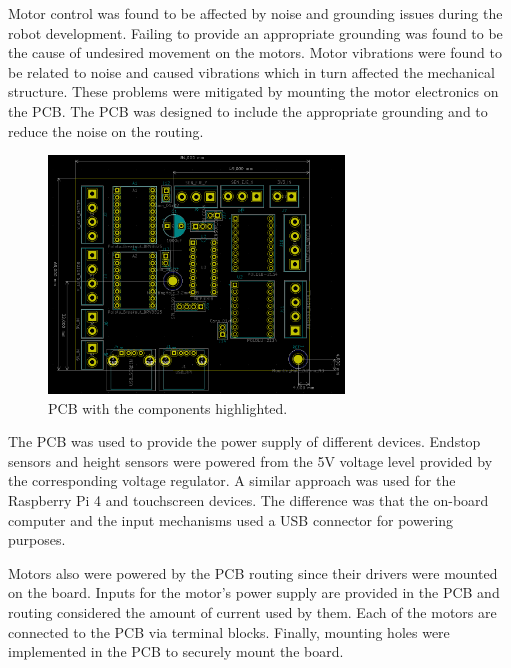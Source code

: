 \documentclass{article}
\begin{document}
Motor control was found to be affected by noise and grounding issues during the robot development. Failing to provide an appropriate grounding was found to be the cause of undesired movement on the motors. Motor vibrations were found to be related to noise and caused vibrations which in turn affected the mechanical structure. These problems were mitigated by mounting the motor electronics on the PCB. The PCB was designed to include the appropriate grounding and to reduce the noise on the routing. 

\begin{figure}[h]
    \centering
    \includegraphics[width=0.7\textwidth]{images/electronics/pcb/GPR20_PCB_components.png}
    \caption{PCB with the components highlighted.}
    \label{fig:pcb_components}
\end{figure}

The PCB was used to provide the power supply of different devices. Endstop sensors and height sensors were powered from the 5V voltage level provided by the corresponding voltage regulator. A similar approach was used for the Raspberry Pi 4 and touchscreen devices. The difference was that the on-board computer and the input mechanisms used a USB connector for powering purposes. 

Motors also were powered by the PCB routing since their drivers were mounted on the board. Inputs for the motor's power supply are provided in the PCB and routing considered the amount of current used by them. Each of the motors are connected to the PCB via terminal blocks. Finally, mounting holes were implemented in the PCB to securely mount the board.
\end{document}
